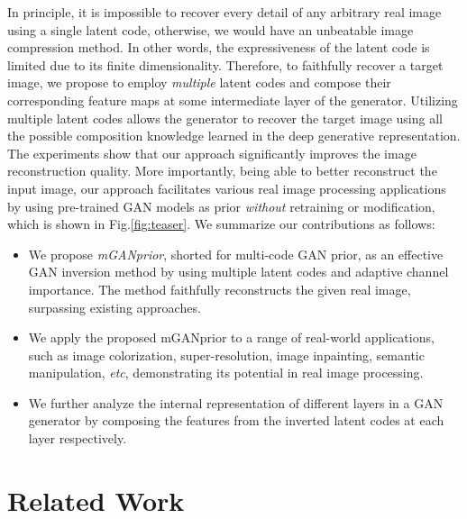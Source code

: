 \documentclass[10pt,twocolumn,letterpaper]{article}
\begin{document}
In principle, it is impossible to recover every detail of any arbitrary real image using a single latent code, otherwise, we would have an unbeatable image compression method.
In other words, the expressiveness of the latent code is limited due to its finite dimensionality.
Therefore, to faithfully recover a target image, we propose to employ \emph{multiple} latent codes and compose their corresponding feature maps at some intermediate layer of the generator.
Utilizing multiple latent codes allows the generator to recover the target image using all the possible composition knowledge learned in the deep generative representation.
The experiments show that our approach significantly improves the image reconstruction quality.
More importantly, being able to better reconstruct the input image, our approach facilitates various real image processing applications by using pre-trained GAN models as prior \emph{without} retraining or modification, which is shown in Fig.\ref{fig:teaser}.
We summarize our contributions as follows:
\begin{itemize}
  \vspace{-5pt}
  \setlength{\itemsep}{0pt}
  \setlength{\parsep}{0pt}
  \setlength{\parskip}{0pt}
\item We propose \emph{mGANprior}, shorted for multi-code GAN prior, as an effective GAN inversion method by using multiple latent codes and adaptive channel importance. The method faithfully reconstructs the given real image, surpassing existing approaches.
\item We apply the proposed mGANprior to a range of real-world applications, such as image colorization, super-resolution, image inpainting, semantic manipulation, \emph{etc}, demonstrating its potential in real image processing.
\item We further analyze the internal representation of different layers in a GAN generator by composing the features from the inverted latent codes at each layer respectively.
\end{itemize}


\section{Related Work}\label{sec:related-work}
\end{document}
